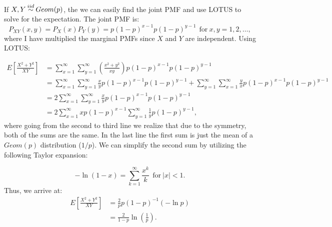 \begin{problem}{8} If $X, Y\distas{iid} Geom(p)$, the we can easily find the joint PMF and use LOTUS to solve for the expectation.  The joint PMF is:
\begin{equation}
P_{XY} (x,y) = P_X(x)P_Y(y) = p(1-p)^{x-1}p(1-p)^{y-1} ~~\mathrm{for}~x, y =1, 2, \ldots,
\end{equation}
where I have multiplied the marginal PMFs since $X$ and $Y$ are independent.  Using LOTUS:

\begin{align*}
E\left [ \frac{X^2+Y^2}{XY}\right] &= \sum_{x=1}^\infty \sum_{y=1}^\infty \left( \frac{x^2+y^2}{xy}\right)p(1-p)^{x-1}p(1-p)^{y-1} \\
& = \sum_{x=1}^\infty \sum_{y=1}^\infty \frac{x}{y}p(1-p)^{x-1}p(1-p)^{y-1} +\sum_{y=1}^\infty \sum_{x=1}^\infty \frac{y}{x}p(1-p)^{x-1}p(1-p)^{y-1} \\
& = 2\sum_{x=1}^\infty \sum_{y=1}^\infty \frac{x}{y}p(1-p)^{x-1}p(1-p)^{y-1} \\
& = 2\sum_{x=1}^\infty x p(1-p)^{x-1} \sum_{y=1}^\infty \frac{1}{y}p(1-p)^{y-1},
\end{align*}
where going from the second to third line we realize that due to the symmetry, both of the sums are the same.  In the last line the first sum is just the mean of a $Geom(p)$ distribution ($1/p$).  We can simplify the second sum by utilizing the following Taylor expansion:

\begin{equation*}
- \ln (1-x)= \sum_{k=1}^\infty \frac{x^k}{k}~~ \mathrm{for}~|x|<1.
\end{equation*}
Thus, we arrive at:
\begin{align*}
E\left [ \frac{X^2+Y^2}{XY}\right] & = \frac{2}{p}p(1-p)^{-1} (-\ln p) \\
& = \frac{2}{1-p} \ln \left(\frac{1}{p} \right).
\end{align*}
\end{problem}

